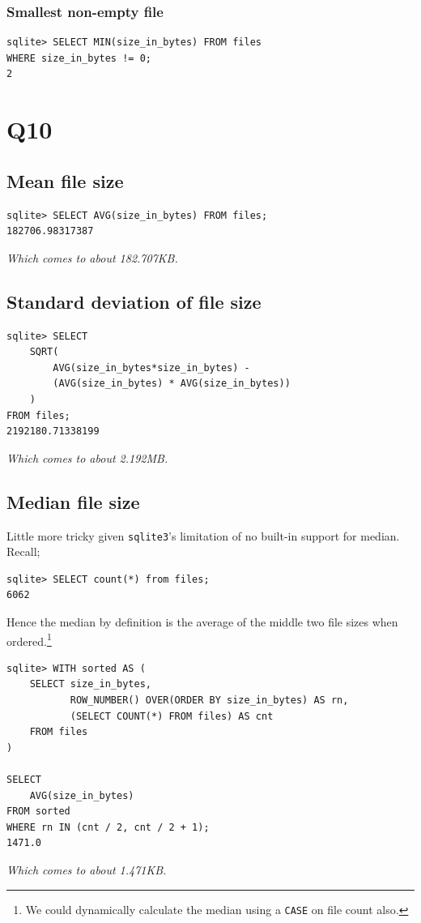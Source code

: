 \documentclass{article}
\begin{document}
\subsubsection*{Smallest non-empty file}
\begin{small}
\begin{verbatim}
sqlite> SELECT MIN(size_in_bytes) FROM files 
WHERE size_in_bytes != 0;
2
\end{verbatim}
\end{small}

\section*{Q10}
\subsection*{Mean file size}
\begin{small}
\begin{verbatim}
sqlite> SELECT AVG(size_in_bytes) FROM files;
182706.98317387
\end{verbatim}
\end{small}
\textit{Which comes to about 182.707KB.}

\subsection*{Standard deviation of file size}
\begin{small}
\begin{verbatim}
sqlite> SELECT 
    SQRT(
        AVG(size_in_bytes*size_in_bytes) - 
        (AVG(size_in_bytes) * AVG(size_in_bytes))
    )
FROM files;
2192180.71338199
\end{verbatim}
\end{small}
\textit{Which comes to about 2.192MB.}

\subsection*{Median file size}
Little more tricky given \texttt{sqlite3}'s limitation of no built-in support for median. Recall;
\begin{small}
\begin{verbatim}
sqlite> SELECT count(*) from files;
6062
\end{verbatim}
\end{small}
Hence the median by definition is the average of the middle two file sizes when ordered.\footnote{We could dynamically calculate the median using a \texttt{CASE} on file count also.}
\begin{small}
\begin{verbatim}
sqlite> WITH sorted AS (
    SELECT size_in_bytes,
           ROW_NUMBER() OVER(ORDER BY size_in_bytes) AS rn,
           (SELECT COUNT(*) FROM files) AS cnt
    FROM files
)

SELECT 
    AVG(size_in_bytes)
FROM sorted
WHERE rn IN (cnt / 2, cnt / 2 + 1);
1471.0
\end{verbatim}
\end{small}
\textit{Which comes to about 1.471KB.}
\end{document}
